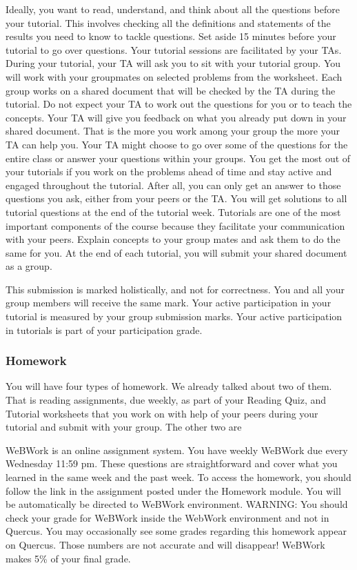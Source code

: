 \documentclass[11pt,fleqn]{book} %
\begin{document}
Ideally, you want to read, understand, and think about all the questions before your tutorial. This involves checking all the definitions and statements of the results you need to know to tackle questions.  Set aside 15 minutes before your tutorial to go over questions. Your tutorial sessions are facilitated by your TAs. During your tutorial, your TA will ask you to sit with your tutorial group. You will work with your groupmates on selected problems from the worksheet. Each group works on a shared document that will be checked by the TA during the tutorial. Do not expect your TA to work out the questions for you or to teach the concepts.  Your TA will give you feedback on what you already put down in your shared document. That is the more you work among your group the more your TA can help you. Your TA might choose to go over some of the questions for the entire class or answer your questions within your groups. You get the most out of your tutorials if you work on the problems ahead of time and stay active and engaged throughout the tutorial. After all, you can only get an answer to those questions you ask, either from your peers or the TA.  You will get solutions to all tutorial questions at the end of the tutorial week. Tutorials are one of the most important components of the course because they facilitate your communication with your peers.  Explain concepts to your group mates and ask them to do the same for you.  At the end of each tutorial, you will submit your shared document as a group.

This submission is marked holistically, and not for correctness. You and all your group members will receive the same mark. Your active participation in your tutorial is measured by your group submission marks. Your active participation in tutorials is part of your participation grade.

\subsubsection{Homework}
You will have four types of homework. We already talked about two of them. That is reading assignments, due weekly, as part of your Reading Quiz, and Tutorial worksheets that you work on with help of your peers during your tutorial and submit with your group.  The other two are

 WeBWork is an online assignment system. You have weekly WeBWork due every Wednesday 11:59 pm.  These questions are straightforward and cover what you learned in the same week and the past week. To access the homework, you should follow the link in the assignment posted under the Homework module. You will be automatically be directed to WeBWork environment. {\color{red}WARNING:} You should check your grade for WeBWork inside the WebWork environment and not in Quercus. You may occasionally see some grades regarding this homework appear on Quercus. Those numbers are not accurate and will disappear! WeBWork makes 5\% of your final grade.
\end{document}
